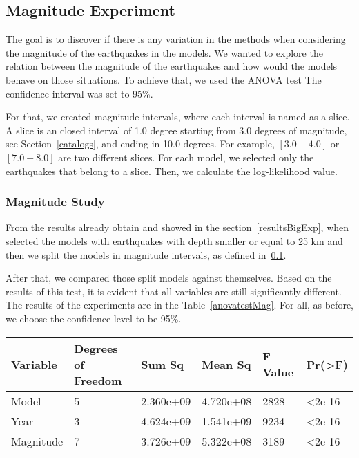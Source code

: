 \subsection{Magnitude Experiment}\label{magExp}
The goal is to discover if there is any variation in the methods when considering the magnitude of the earthquakes in the models. We wanted to explore the relation between the magnitude of the earthquakes and how would the models behave on those situations. To achieve that, we used the ANOVA test The confidence interval was set to 95\%.


For that, we created magnitude intervals, where each interval is named as a slice. A slice is an closed interval of 1.0 degree  starting from 3.0 degrees of magnitude, see Section~\ref{catalogs}, and ending in 10.0 degrees. For example, $[3.0-4.0]$ or $[7.0-8.0]$ are two different slices. For each model, we selected only the earthquakes that belong to a slice. Then, we calculate the log-likelihood value.
\subsubsection{Magnitude Study}
From the results already obtain and showed in the section~\ref{resultsBigExp}, when selected the models with earthquakes with depth smaller or equal to 25 km and then we split the models in magnitude intervals, as defined in~\ref{magExp}.

After that, we compared those split models against themselves. Based on the results of this test, it is evident that all variables are still significantly different. The results of the experiments are in the Table~\ref{anovatestMag}. For all, as before, we choose the confidence level to be 95\%.


\begin{table*}[!ht]
	\centering
	\begin{tabular}{|l|l|l|l|l|l|}
		\hline
		{Variable} & {Degrees of Freedom} & {Sum Sq}    & {Mean Sq}   & {F Value} & {Pr(\textgreater F)} \\
		\hline
		Model       & 5            	  & 2.360e+09      & 4.720e+08     & 2828     & \textless2e-16     \\
		\hline
		Year        & 3                  & 4.624e+09   & 1.541e+09    & 9234     & \textless2e-16     \\
		\hline
		Magnitude   & 7                  & 3.726e+09   & 5.322e+08    & 3189     & \textless2e-16	\\    
		\hline
	\end{tabular}
	\caption{ANOVA Test Results Values - Magnitude Study.}
	\label{anovatestMag}
\end{table*}

